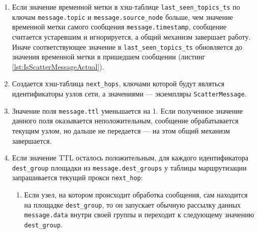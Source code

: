 \documentclass{article}
\theoremstyle{plain}
\theoremstyle{plain}
\theoremstyle{plain}
\theoremstyle{plain}
\theoremstyle{definition}
\theoremstyle{remark}
\theoremstyle{plain}
\begin{document}
\begin{enumerate}
    \item Если значение временной метки в хэш-таблице \texttt{last\_seen\_topics\_ts} по ключам \texttt{message.topic} и \texttt{message.source\_node} больше, чем значение временной метки самого сообщения \texttt{message.timestamp}, сообщение считается устаревшим и игнорируется, а общий механизм завершает работу. Иначе соответствующее значение в \texttt{last\_seen\_topics\_ts} обновляется до значения временной метки в пришедшем сообщении (листинг \ref{lst:IsScatterMessageActual}).


    \item Создается хэш-таблица \texttt{next\_hops}, ключами которой будут являться идентификаторы узлов сети, а значениями --- экземпляры \texttt{ScatterMessage}.
    
    \item Значение поля \texttt{message.ttl} уменьшается на 1. Если полученное значение данного поля оказывается неположительным, сообщение обрабатывается текущим узлом, но дальше не передается --- на этом общий механизм завершается.
    
    \item Если значение TTL осталось положительным, для каждого идентификатора \\
    \texttt{dest\_group} площадки из \texttt{message.dest\_groups} у таблицы маршрутизации запрашивается текущий прокси \texttt{next\_hop}:
    
    \begin{enumerate}
        \item Если узел, на котором происходит обработка сообщения, сам находится на площадке \texttt{dest\_group}, то он запускает обычную рассылку данных \texttt{message.data} внутри своей группы и переходит к следующему значению \texttt{dest\_group}.
    

\end{enumerate}
\end{enumerate}
\end{document}
